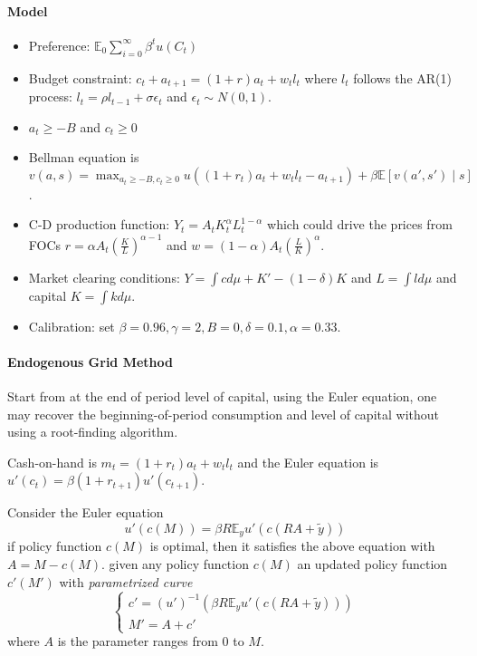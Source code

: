 \documentclass[11pt,a4paper]{article}
\begin{document}
\paragraph{Model\citep{Aiyagari1994}}
\begin{itemize}
    \item Preference: $\mathbb{E}_0\sum_{i=0}^\infty \beta^t u(C_t)$ 
    \item Budget constraint: $c_t + a_{t+1} = (1+r)a_t + w_t l_t$ where $l_t$ follows the AR(1) process: $l_t = \rho l_{t-1}+\sigma\epsilon_t$ and $\epsilon_t \sim N(0,1)$. 
    \item $a_t \geq -B$ and $c_t\geq 0$
    \item Bellman equation is $v(a,s) = \max_{a_t\geq -B,c_t\geq 0 } u((1+r_t)a_t+w_t l_t-a_{t+1})+ \beta \mathbb{E}[v(a',s')\mid s]$.
    \item C-D production function: $Y_t = A_t K^\alpha_t L^{1-\alpha}_t$ which could drive the prices from FOCs $r = \alpha A_t\left(\frac{K}{L}\right)^{\alpha-1}$ and $w = (1-\alpha )A_t \left(\frac{L}{K}\right)^{\alpha }$. 
    \item Market clearing conditions: $Y = \int c d\mu + K' -(1-\delta )K$ and $L = \int l d\mu$ and capital $K = \int k d\mu$. 
    \item Calibration: set $\beta = 0.96,\gamma=2,B=0,\delta = 0.1,\alpha=0.33$. 
\end{itemize}
\paragraph{Endogenous Grid Method\citep{carrollMethodEndogenousGridpoints2006}} Start from at the end of period level of capital, using the Euler equation, one may recover the beginning-of-period consumption and level of capital without using a root-finding algorithm. 

Cash-on-hand is $m_t = (1+r_t)a_t + w_t l_t$ and the Euler equation is $u'(c_t) = \beta (1+r_{t+1})u'(c_{t+1})$.


Consider the Euler equation $$ u'(c(M)) = \beta R \mathbb{E}_y u'(c(RA+\tilde{y})) $$
if policy function $c(M)$ is optimal, then it satisfies the above equation with $A = M-c(M)$. given any policy function $c(M)$ an updated policy function $c'(M')$ with \textit{parametrized curve} 
$$ \begin{cases}
    c' = (u')^{-1}\left(\beta R \mathbb{E}_y u'(c(RA+\tilde{y}))\right)\\ 
    M' = A + c'
\end{cases} $$
where $A$ is the parameter ranges from $0$ to $M$. 
\end{document}
